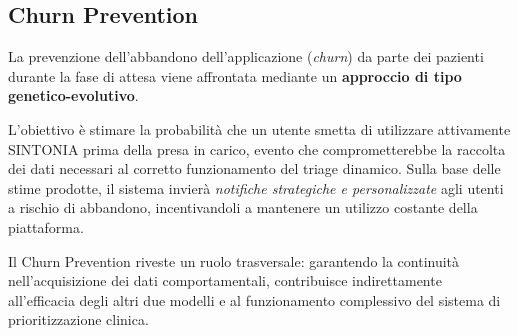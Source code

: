 \subsection{Churn Prevention}
\label{subsec:churn}
La prevenzione dell'abbandono dell'applicazione (\textit{churn}) da parte dei pazienti durante la fase di attesa viene affrontata mediante un \textbf{approccio di tipo genetico-evolutivo}.

L'obiettivo è stimare la probabilità che un utente smetta di utilizzare attivamente SINTONIA prima della presa in carico, evento che comprometterebbe la raccolta dei dati necessari al corretto funzionamento del triage dinamico. Sulla base delle stime prodotte, il sistema invierà \textit{notifiche strategiche e personalizzate} agli utenti a rischio di abbandono, incentivandoli a mantenere un utilizzo costante della piattaforma.

Il Churn Prevention riveste un ruolo trasversale: garantendo la continuità nell'acquisizione dei dati comportamentali, contribuisce indirettamente all'efficacia degli altri due modelli e al funzionamento complessivo del sistema di prioritizzazione clinica.


